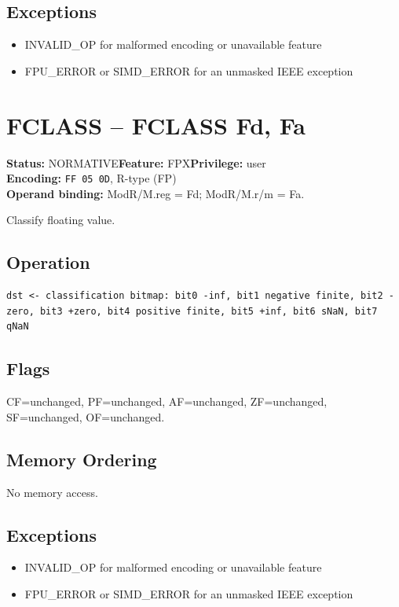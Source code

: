 \documentclass[10pt]{article}
\begin{document}
\subsection*{Exceptions}
\begin{itemize}
\item INVALID\_OP for malformed encoding or unavailable feature
\item FPU\_ERROR or SIMD\_ERROR for an unmasked IEEE exception
\end{itemize}
\clearpage

\section{FCLASS -- FCLASS Fd, Fa}
\textbf{Status:} NORMATIVE\quad \textbf{Feature:} FPX\quad \textbf{Privilege:} user\\
\textbf{Encoding:} \texttt{FF 05 0D}, R-type (FP)\\
\textbf{Operand binding:} ModR/M.reg = Fd; ModR/M.r/m = Fa.

Classify floating value.

\subsection*{Operation}
\begin{lstlisting}
dst <- classification bitmap: bit0 -inf, bit1 negative finite, bit2 -zero, bit3 +zero, bit4 positive finite, bit5 +inf, bit6 sNaN, bit7 qNaN
\end{lstlisting}
\subsection*{Flags}
CF=unchanged, PF=unchanged, AF=unchanged, ZF=unchanged, SF=unchanged, OF=unchanged.
\subsection*{Memory Ordering}
No memory access.
\subsection*{Exceptions}
\begin{itemize}
\item INVALID\_OP for malformed encoding or unavailable feature
\item FPU\_ERROR or SIMD\_ERROR for an unmasked IEEE exception
\end{itemize}
\clearpage
\end{document}
